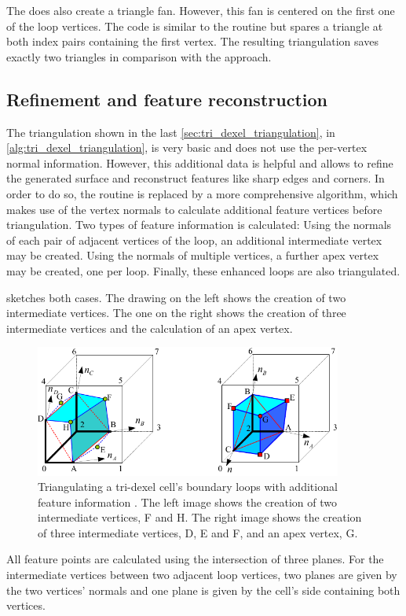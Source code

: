 The  does also create a triangle fan.
However, this fan is centered on the first one of the loop vertices.
The code is similar to the  routine but spares a triangle at both index pairs containing the first vertex.
The resulting triangulation saves exactly two triangles in comparison with the  approach.


\subsection{Refinement and feature reconstruction}
\label{sec:tri_dexel_refinement}

The triangulation shown in the last \cref{sec:tri_dexel_triangulation},  in \cref{alg:tri_dexel_triangulation}, is very basic and does not use the per-vertex normal information.
However, this additional data is helpful and allows to refine the generated surface and reconstruct features like sharp edges and corners.
In order to do so, the  routine is replaced by a more comprehensive algorithm, which makes use of the vertex normals to calculate additional feature vertices before triangulation.
Two types of feature information is calculated:
Using the normals of each pair of adjacent vertices of the loop, an additional intermediate vertex may be created.
Using the normals of multiple vertices, a further apex vertex may be created, one per loop.
Finally, these enhanced loops are also triangulated.

 sketches both cases.
The drawing on the left shows the creation of two intermediate vertices.
The one on the right shows the creation of three intermediate vertices and the calculation of an apex vertex.
%
\begin{figure}
	\centering
	\includegraphics[width=0.9\textwidth]{images/tri_dexel_refinement}
	\caption{
		Triangulating a tri-dexel cell's boundary loops with additional feature information \cite{tridexel_reconstruction}.
		The left image shows the creation of two intermediate vertices, F and H.
		The right image shows the creation of three intermediate vertices, D, E and F, and an apex vertex, G.
	}
	\label{fig:tri_dexel_refinement}
\end{figure}
%
All feature points are calculated using the intersection of three planes.
For the intermediate vertices between two adjacent loop vertices, two planes are given by the two vertices' normals and one plane is given by the cell's side containing both vertices.

